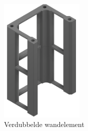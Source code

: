 \begin{minipage}[t]{0.49\textwidth}
    \vspace{0pt}
    \begin{figure}[H]
        \centering
        \captionsetup{width=1\textwidth} %
        \includegraphics[height=6cm]{figures/Wall_2_w.png}
        \caption{Verdubbelde wandelement}\label{fig:dubbelemuur}
    \end{figure}
\end{minipage}\\

